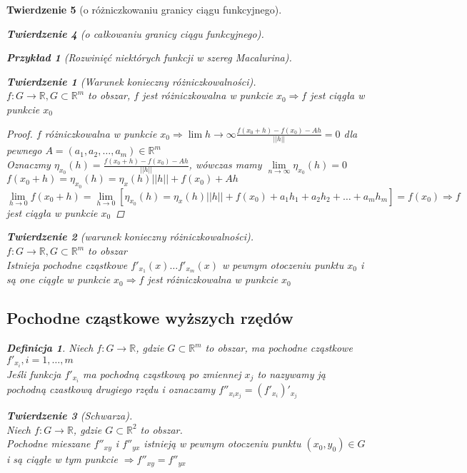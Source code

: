 \documentclass[12pt,a4paper]{article}
\newtheorem{tw}{Twierdzenie}
\newtheorem{przyklad}{Przykład}
\theoremstyle{definition}
\newtheorem{df}{Definicja}
\begin{document}
\begin{tw}[o różniczkowaniu granicy ciągu funkcyjnego]
\begin{tw}[o całkowaniu granicy ciągu funkcyjnego]
\begin{przyklad}[Rozwinięć niektórych funkcji w szereg Macalurina]

\begin{tw}[Warunek konieczny różniczkowalności]~\\
$f:G\to\mathbb{R}, G\subset\mathbb{R}^m$ to obszar, $f$ jest różniczkowalna w punkcie $x_0 \Rightarrow f$ jest ciągła w punkcie $x_0$
\begin{proof}
$f$ różniczkowalna w punkcie $x_0 \Rightarrow \lim\limits{h\to\infty}\frac{f(x_0+h)-f(x_0)-Ah}{||h||}=0$ dla pewnego $A=(a_1,a_2, \dots, a_m) \in \mathbb{R}^m$\\
Oznaczmy $\eta_{x_0}(h) = \frac{f(x_0+h)-f(x_0)-Ah}{||h||}$, wówczas mamy $\lim\limits_{n\to\infty}\eta_{x_0}(h) = 0$\\
$f(x_0+h)=\eta_{x_0}(h) = \eta_x(h)||h|| + f(x_0) + Ah$\\
$\lim\limits_{h\to 0}f(x_0+h) = \lim\limits_{h\to 0}[\eta_{x_0}(h) = \eta_x(h)||h|| + f(x_0) + a_1h_1 + a_2h_2 + \dots + a_mh_m] = f(x_0) \Rightarrow f$ jest ciągła w punkcie $x_0$
\end{proof}
\end{tw}

\begin{tw}[warunek konieczny różniczkowalności]~\\
$f: G\to\mathbb{R}, G\subset \mathbb{R}^m$ to obszar\\
Istnieja pochodne cząstkowe $f'_{x_1}(x)\dots f'_{x_m}(x)$ w pewnym otoczeniu punktu $x_0$ i są one ciągłe w punkcie $x_0 \Rightarrow f$ jest różniczkowalna w punkcie $x_0$
\end{tw}

\subsection{Pochodne cząstkowe wyższych rzędów}
\begin{df}
Niech $f: G\to\mathbb{R}$, gdzie $G\subset \mathbb{R}^m$ to obszar, ma pochodne cząstkowe $f'_{x_i}, i=1,\dots , m$\\
Jeśli funkcja $f'_{x_i}$ ma pochodną cząstkową po zmiennej $x_j$ to nazywamy ją pochodną czastkową drugiego rzędu i oznaczamy $f''_{x_ix_j} = (f'_{x_i})'_{x_j}$
\end{df}

\begin{tw}[Schwarza]~\\
Niech $f: G\to\mathbb{R}$, gdzie $G\subset \mathbb{R}^2$ to obszar.\\
Pochodne mieszane $f''_{xy}$ i $f''_{yx}$ istnieją w pewnym otoczeniu punktu $(x_0, y_0)\in G$ i są ciągłe w tym punkcie $\Rightarrow f''_{xy} = f''_{yx}$
\end{tw}


\end{przyklad}
\end{tw}
\end{tw}
\end{document}
